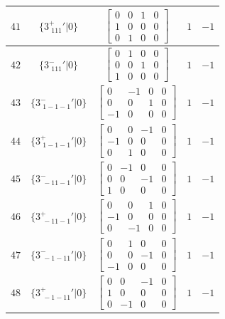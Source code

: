 \documentclass[fleqn,8pt]{jsarticle}
\begin{document}
\begin{longtable}{ccccc}
$ 41 $ & $ \{3^{+}_{\,\,111}{}'|0\} $ & $ \begin{bmatrix} 0 & 0 & 1 & 0 \\ 1 & 0 & 0 & 0 \\ 0 & 1 & 0 & 0 \end{bmatrix} $ & $ 1 $ & $ -1 $ \\ \hline
$ 42 $ & $ \{3^{-}_{\,\,111}{}'|0\} $ & $ \begin{bmatrix} 0 & 1 & 0 & 0 \\ 0 & 0 & 1 & 0 \\ 1 & 0 & 0 & 0 \end{bmatrix} $ & $ 1 $ & $ -1 $ \\ \hline
$ 43 $ & $ \{3^{-}_{\,\,1-1-1}{}'|0\} $ & $ \begin{bmatrix} 0 & -1 & 0 & 0 \\ 0 & 0 & 1 & 0 \\ -1 & 0 & 0 & 0 \end{bmatrix} $ & $ 1 $ & $ -1 $ \\ \hline
$ 44 $ & $ \{3^{+}_{\,\,1-1-1}{}'|0\} $ & $ \begin{bmatrix} 0 & 0 & -1 & 0 \\ -1 & 0 & 0 & 0 \\ 0 & 1 & 0 & 0 \end{bmatrix} $ & $ 1 $ & $ -1 $ \\ \hline
$ 45 $ & $ \{3^{-}_{\,\,-11-1}{}'|0\} $ & $ \begin{bmatrix} 0 & -1 & 0 & 0 \\ 0 & 0 & -1 & 0 \\ 1 & 0 & 0 & 0 \end{bmatrix} $ & $ 1 $ & $ -1 $ \\ \hline
$ 46 $ & $ \{3^{+}_{\,\,-11-1}{}'|0\} $ & $ \begin{bmatrix} 0 & 0 & 1 & 0 \\ -1 & 0 & 0 & 0 \\ 0 & -1 & 0 & 0 \end{bmatrix} $ & $ 1 $ & $ -1 $ \\ \hline
$ 47 $ & $ \{3^{-}_{\,\,-1-11}{}'|0\} $ & $ \begin{bmatrix} 0 & 1 & 0 & 0 \\ 0 & 0 & -1 & 0 \\ -1 & 0 & 0 & 0 \end{bmatrix} $ & $ 1 $ & $ -1 $ \\ \hline
$ 48 $ & $ \{3^{+}_{\,\,-1-11}{}'|0\} $ & $ \begin{bmatrix} 0 & 0 & -1 & 0 \\ 1 & 0 & 0 & 0 \\ 0 & -1 & 0 & 0 \end{bmatrix} $ & $ 1 $ & $ -1 $ \\
\end{longtable}
\end{document}
